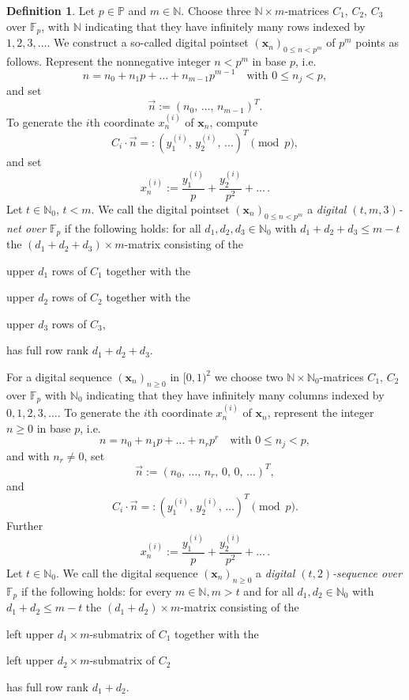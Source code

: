 \documentclass[10pt,a4paper]{amsart}
\newcommand{\bsx}{\boldsymbol{x}}%
\newcommand{\bsT}{\boldsymbol{T}}%
\newcommand{\NN}{\mathbb N}
\newcommand{\PP}{\mathbb P}
\newcommand{\FF}{\mathbb{F}}
\renewcommand{\(}{\left (}
\renewcommand{\)}{\right )}
\theoremstyle{definition}
\newtheorem{definition}[theorem]{Definition}
\numberwithin{equation}{section}
\begin{document}
\begin{definition}\label{def:t}
Let $p\in\PP$ and $m\in\NN$. Choose three $\NN\times m$-matrices $C_1,\,C_2,\,C_3$ over $\FF_p$, with $\NN$ indicating that they have infinitely many rows indexed by $1,2,3,\ldots$.  We construct a so-called digital pointset $(\bsx_n)_{0\leq n<p^m}$ of $p^m$ points as follows. Represent the nonnegative integer $n<p^m$ in base $p$, i.e.
$$ n = n_0+n_1p+\dots+n_{m-1}p^{m-1}\quad \mbox{with }0\leq n_j<p, $$
and set
$$ \vec n :=(n_0,\,\dots,\,n_{m-1})^T. $$
To generate the $i$th coordinate $x_n^{(i)}$ of $\bsx_n$, compute 
$$ C_i\cdot\vec n =:(y_1^{(i)},\,y_2^{(i)},\,\dots)^T\pmod{p}, $$
and set
$$ x_n^{(i)}:=\frac {y_1^{(i)}}p+\frac {y_2^{(i)}}{p^2}+\dots\,. $$
Let $t\in\NN_0$, $t<m$. We call the digital pointset $(\bsx_n)_{0\leq n<p^m}$ a \emph{digital $(t,m,3)$-net over $\FF_p$} if the following holds: 
for all $d_1,d_2,d_3\in\NN_0$ with $d_1+d_2+d_3\leq m-t$ the $(d_1+d_2+d_3)\times m$-matrix consisting of the

upper $d_1$ rows of $C_1$ together with the

upper $d_2$ rows of $C_2$ together with the

upper $d_3$ rows of $C_3$, 

\noindent has full row rank $d_1+d_2+d_3$.


For a digital sequence $(\bsx_n)_{n\geq 0}$ in $ [0,1)^2$ we choose two $\NN\times\NN_0$-matrices $C_1,\,C_2$ over $\FF_p$  with $\NN_0$ indicating that they have infinitely many columns indexed by $0,1,2,3,\ldots$. To generate the $i$th coordinate $x_n^{(i)}$ of $\bsx_n$, represent the integer $n\geq 0$ in base $p$, i.e.
$$ n = n_0+n_1p+\dots+n_rp^r\quad \mbox{with }0\leq n_j<p, $$
and with $n_r\neq 0$, set
$$ \vec n :=(n_0,\,\dots,\,n_r,\,0,\,0,\,\dots)^T, $$
and 
$$ C_i\cdot\vec n =:(y_1^{(i)},\,y_2^{(i)},\,\dots)^T\pmod{p}. $$
Further
$$ x_n^{(i)}:=\frac {y_1^{(i)}}p+\frac {y_2^{(i)}}{p^2}+\dots\,. $$
Let $t\in\NN_0$. We call the digital sequence $(\bsx_n)_{n\ge 0}$ a \emph{digital $(t,2)$-sequence over $\FF_p$} if the following holds: 
for every $m\in\NN, m>t$ and for all $d_1,d_2\in\NN_0$ with $d_1+d_2\leq m-t$ the $(d_1+d_2)\times m$-matrix consisting of the

left upper $d_1 \times m$-submatrix of $C_1$ together with the

left upper $d_2 \times m$-submatrix of $C_2$ 

\noindent has full row rank $d_1+d_2$.

\end{definition}
\end{document}
